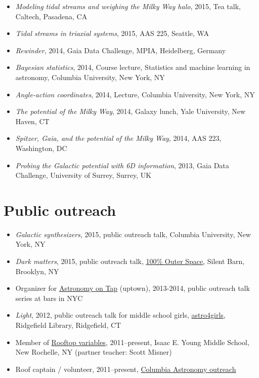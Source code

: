 \documentclass[12pt,letterpaper]{article}
\begin{document}
\begin{itemize}

	\item \emph{Modeling tidal streams and weighing the Milky Way halo}, 2015, Tea talk, Caltech, Pasadena, CA
	\item \emph{Tidal streams in triaxial systems}, 2015, AAS 225, Seattle, WA
	\item \emph{Rewinder}, 2014, Gaia Data Challenge, MPIA, Heidelberg, Germany
	\item \emph{Bayesian statistics}, 2014, Course lecture, Statistics and machine learning in astronomy, Columbia University, New York, NY
	\item \emph{Angle-action coordinates}, 2014, Lecture, Columbia University, New York, NY
	\item \emph{The potential of the Milky Way}, 2014, Galaxy lunch, Yale University, New Haven, CT
	\item \emph{Spitzer, Gaia, and the potential of the Milky Way}, 2014, AAS 223, Washington, DC
	\item \emph{Probing the Galactic potential with 6D information}, 2013, Gaia Data Challenge, University of Surrey, Surrey, UK

\end{itemize}

\section*{Public outreach}

\begin{itemize}
	\item \emph{Galactic synthesizers}, 2015, public outreach talk, Columbia University, New York, NY
	\item \emph{Dark matters}, 2015, public outreach talk, \href{http://silentbarn.org/2015/03/100-outer-space-party}{100\% Outer Space}, Silent Barn, Brooklyn, NY
	\item Organizer for \href{http://astronomyontap.org/}{Astronomy on Tap} (uptown), 2013-2014, public outreach talk series at bars in NYC
	\item \emph{Light}, 2012, public outreach talk for middle school girls, \href{http://www.newstimes.com/news/article/Astronomer-Shoot-for-the-stars-3380793.php}{astro4girls}, Ridgefield Library, Ridgefield, CT
	\item Member of \href{http://rv.astro.columbia.edu}{Rooftop variables}, 2011--present, Isaac E. Young Middle School, New Rochelle, NY (partner teacher: Scott Misner)
	\item Roof captain / volunteer, 2011--present, \href{http://outreach.astro.columbia.edu/}{Columbia Astronomy outreach}

\end{itemize}
\end{document}
